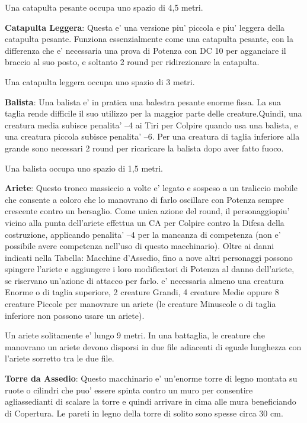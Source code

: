 \documentclass[a4paper,11pt,twoside,openany]{dndbook}
\begin{document}
Una catapulta pesante occupa uno spazio di 4,5 metri.

\textbf{Catapulta Leggera}: Questa e' una versione piu' piccola e piu' leggera della catapulta pesante. Funziona essenzialmente come una catapulta pesante, con la differenza che e' necessaria una prova di Potenza con DC 10 per agganciare il braccio al suo posto, e soltanto 2 round per ridirezionare la catapulta.

Una catapulta leggera occupa uno spazio di 3 metri.

\textbf{Balista}: Una balista e' in pratica una balestra pesante enorme fissa. La sua taglia rende difficile il suo utilizzo per la maggior parte delle creature.Quindi, una creatura media subisce penalita' --4 ai Tiri per Colpire quando usa una balista, e una creatura piccola subisce penalita' --6. Per una creatura di taglia inferiore alla grande sono necessari 2 round per ricaricare la balista dopo aver fatto fuoco.

Una balista occupa uno spazio di 1,5 metri.

\textbf{Ariete}: Questo tronco massiccio a volte e' legato e sospeso a un traliccio mobile che consente a coloro che lo manovrano di farlo oscillare con Potenza sempre crescente contro un bersaglio. Come unica azione del round, il personaggiopiu' vicino alla punta dell'ariete effettua un CA per Colpire contro la Difesa della costruzione, applicando penalita' --4 per la mancanza di competenza (non e' possibile avere competenza nell'uso di questo macchinario). Oltre ai danni indicati nella Tabella: Macchine d'Assedio, fino a nove altri personaggi possono spingere l'ariete e aggiungere i loro modificatori di Potenza al danno dell'ariete, se riservano un'azione di attacco per farlo. e' necessaria almeno una creatura Enorme o di taglia superiore, 2 creature Grandi, 4 creature Medie oppure 8 creature Piccole per manovrare un ariete (le creature Minuscole o di taglia inferiore non possono usare un ariete).

Un ariete solitamente e' lungo 9 metri. In una battaglia, le creature che manovrano un ariete devono disporsi in due file adiacenti di eguale lunghezza con l'ariete sorretto tra le due file. 

\textbf{Torre da Assedio}: Questo macchinario e' un'enorme torre di legno montata su ruote o cilindri che puo' essere spinta contro un muro per consentire agliassedianti di scalare la torre e quindi arrivare in cima alle mura beneficiando di Copertura. Le pareti in legno della torre di solito sono spesse circa 30 cm.
\end{document}
